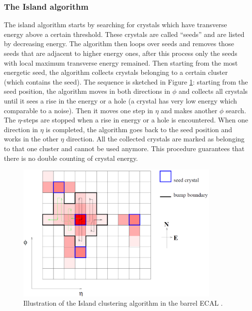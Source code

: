 \subsubsection{The Island algorithm}\label{subsubsec:Island}

The island algorithm starts by searching for crystals which have transverse energy above a certain threshold. These crystals are called ``seeds'' and are listed by decreasing energy. The algorithm then loops over seeds and removes those seeds that are adjacent to higher energy ones, after this process only the seeds with local maximum transverse energy remained. Then starting from the most energetic seed, the algorithm collects crystals belonging to a certain cluster (which contains the seed). The sequence is sketched in Figure \ref{fig:Cluster_Island}: starting from the seed position, the algorithm moves in both directions in $\phi$ and collects all crystals until it sees a rise in the energy or a hole (a crystal has very low energy which comparable to a noise). Then it moves one step in $\eta$ and makes another $\phi$ search. The $\eta$-steps are stopped when a rise in energy or a hole is encountered. When one direction in $\eta$ is completed, the algorithm goes back to the seed position and works in the other $\eta$ direction. All the collected crystals are marked as belonging to that one cluster and cannot be used anymore. This procedure guarantees that there is no double counting of crystal energy.

\begin{figure}[h!]
\begin{center}
\includegraphics[width=0.9\textwidth]{figures/Reconstruction/Electron_photon/Island.png}
\caption{Illustration of the Island clustering algorithm in the barrel ECAL \cite{CMS-Note-2001-034}.}
\label{fig:Cluster_Island}
\end{center}
\end{figure}

